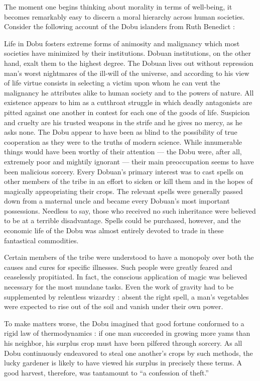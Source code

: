 \documentclass[a4paper,14pt]{extbook}
\begin{document}
The moment one begins thinking about morality in terms of well-being, it becomes remarkably easy to discern a moral hierarchy across human societies.
Consider the following account of the Dobu islanders from Ruth Benedict :

Life in Dobu fosters extreme forms of animosity and malignancy which most societies have minimized by their institutions.
Dobuan institutions, on the other hand, exalt them to the highest degree.
The Dobuan lives out without repression man's worst nightmares of the ill-will of the universe, and according to his view of life virtue consists in selecting a victim upon whom he can vent the malignancy he attributes alike to human society and to the powers of nature.
All existence appears to him as a cutthroat struggle in which deadly antagonists are pitted against one another in contest for each one of the goods of life.
Suspicion and cruelty are his trusted weapons in the strife and he gives no mercy, as he asks none.
The Dobu appear to have been as blind to the possibility of true cooperation as they were to the truths of modern science.
While innumerable things would have been worthy of their attention --- the Dobu were, after all, extremely poor and mightily ignorant --- their main preoccupation seems to have been malicious sorcery.
Every Dobuan's primary interest was to cast spells on other members of the tribe in an effort to sicken or kill them and in the hopes of magically appropriating their crops.
The relevant spells were generally passed down from a maternal uncle and became every Dobuan's most important possessions.
Needless to say, those who received no such inheritance were believed to be at a terrible disadvantage.
Spells could be purchased, however, and the economic life of the Dobu was almost entirely devoted to trade in these fantastical commodities.

Certain members of the tribe were understood to have a monopoly over both the causes and cures for specific illnesses.
Such people were greatly feared and ceaselessly propitiated.
In fact, the conscious application of magic was believed necessary for the most mundane tasks.
Even the work of gravity had to be supplemented by relentless wizardry :
absent the right spell, a man's vegetables were expected to rise out of the soil and vanish under their own power.

To make matters worse, the Dobu imagined that good fortune conformed to a rigid law of thermodynamics :
if one man succeeded in growing more yams than his neighbor, his surplus crop must have been pilfered through sorcery.
As all Dobu continuously endeavored to steal one another's crops by such methods, the lucky gardener is likely to have viewed his surplus in precisely these terms.
A good harvest, therefore, was tantamount to ``a confession of theft.''
\end{document}
